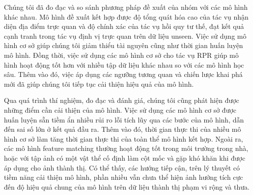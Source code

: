 Chúng tôi đã đo đạc và so sánh phương pháp đề xuất của nhóm với các mô hình khác nhau. Mô hình đề xuất kết hợp được độ tổng quát hóa cao của tác vụ nhận diện địa điểm trực quan và độ chính xác của tác vụ hồi quy tư thế, đạt kết quả cạnh tranh trong tác vụ định vị trực quan trên dữ liệu unseen. Việc sử dụng mô hình cơ sở giúp chúng tôi giảm thiểu tài nguyên cũng như thời gian huấn luyện mô hình. Đồng thời, việc sử dụng các mô hình cơ sở cho tác vụ RPR giúp mô hình hoạt động tốt hơn với nhiều tập dữ liệu khác nhau so với các mô hình học sâu. Thêm vào đó, việc áp dụng các ngưỡng tương quan và chiến lược khai phá mới đã giúp chúng tôi tiếp tục cải thiện hiệu quả của mô hình.

Qua quá trình thí nghiệm, đo đạc và đánh giá, chúng tôi cũng phát hiện được những điểm cần cải thiện của mô hình. Việc sử dụng các mô hình cơ sở được huấn luyện sẵn tiềm ẩn nhiều rủi ro lỗi tích lũy qua các bước của mô hình, dẫn đến sai số lớn ở kết quả đầu ra. Thêm vào đó, thời gian thực thi của nhiều mô hình cơ sở làm tăng thời gian thực thi của toàn thể mô hình kết hợp. Ngoài ra, các mô hình feature matching thường hoạt động tốt trong môi trường trong nhà, hoặc với tập ảnh có một vật thể cố định làm cột mốc và gặp khó khăn khi được áp dụng cho ảnh thành thị. Có thể thấy, các hướng tiếp cận, trên lý thuyết có tiềm năng cải thiện mô hình, phần nhiều vẫn chưa thể hiện ảnh hưởng tích cực đến độ hiệu quả chung của mô hình trên dữ liệu thành thị phạm vi rộng và thưa.
